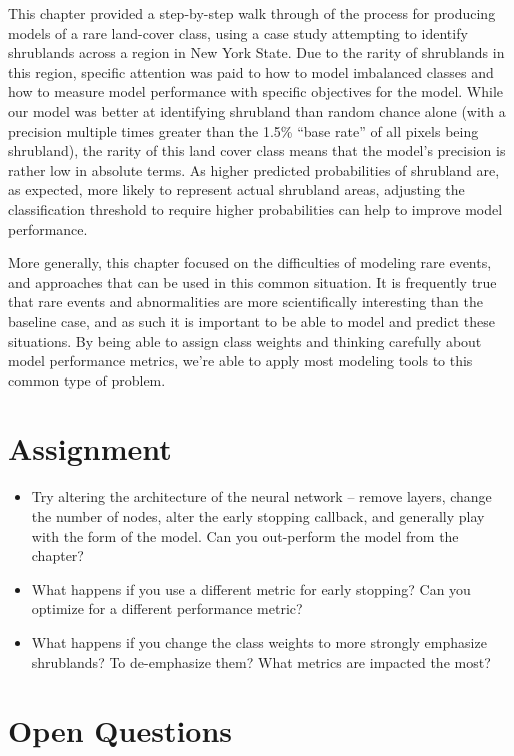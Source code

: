 \documentclass[
  letterpaper,
  DIV=11,
  numbers=noendperiod]{scrartcl}
\providecommand{\tightlist}{%
  \setlength{\itemsep}{0pt}\setlength{\parskip}{0pt}}\usepackage{longtable,booktabs,array}
\begin{document}
This chapter provided a step-by-step walk through of the process for
producing models of a rare land-cover class, using a case study
attempting to identify shrublands across a region in New York State. Due
to the rarity of shrublands in this region, specific attention was paid
to how to model imbalanced classes and how to measure model performance
with specific objectives for the model. While our model was better at
identifying shrubland than random chance alone (with a precision
multiple times greater than the 1.5\% ``base rate'' of all pixels being
shrubland), the rarity of this land cover class means that the model's
precision is rather low in absolute terms. As higher predicted
probabilities of shrubland are, as expected, more likely to represent
actual shrubland areas, adjusting the classification threshold to
require higher probabilities can help to improve model performance.

More generally, this chapter focused on the difficulties of modeling
rare events, and approaches that can be used in this common situation.
It is frequently true that rare events and abnormalities are more
scientifically interesting than the baseline case, and as such it is
important to be able to model and predict these situations. By being
able to assign class weights and thinking carefully about model
performance metrics, we're able to apply most modeling tools to this
common type of problem.

\hypertarget{assignment}{%
\section{Assignment}\label{assignment}}

\begin{itemize}
\tightlist
\item
  Try altering the architecture of the neural network -- remove layers,
  change the number of nodes, alter the early stopping callback, and
  generally play with the form of the model. Can you out-perform the
  model from the chapter?
\item
  What happens if you use a different metric for early stopping? Can you
  optimize for a different performance metric?
\item
  What happens if you change the class weights to more strongly
  emphasize shrublands? To de-emphasize them? What metrics are impacted
  the most?
\end{itemize}

\hypertarget{open-questions}{%
\section{Open Questions}\label{open-questions}}
\end{document}
